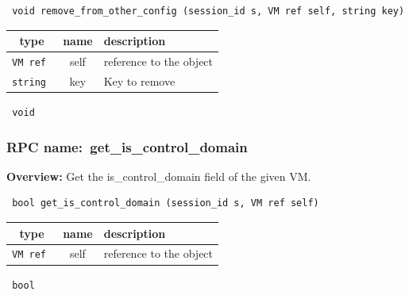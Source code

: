 \begin{verbatim} void remove_from_other_config (session_id s, VM ref self, string key)\end{verbatim}



 
\vspace{0.3cm}
\begin{tabular}{|c|c|p{7cm}|}
 \hline
{\bf type} & {\bf name} & {\bf description} \\ \hline
{\tt VM ref } & self & reference to the object \\ \hline 

{\tt string } & key & Key to remove \\ \hline 

\end{tabular}

\vspace{0.3cm}

{\tt 
void
}



\vspace{0.3cm}
\vspace{0.3cm}
\vspace{0.3cm}
\subsubsection{RPC name:~get\_is\_control\_domain}

{\bf Overview:} 
Get the is\_control\_domain field of the given VM.

\begin{verbatim} bool get_is_control_domain (session_id s, VM ref self)\end{verbatim}



 
\vspace{0.3cm}
\begin{tabular}{|c|c|p{7cm}|}
 \hline
{\bf type} & {\bf name} & {\bf description} \\ \hline
{\tt VM ref } & self & reference to the object \\ \hline 

\end{tabular}

\vspace{0.3cm}

{\tt 
bool
}


